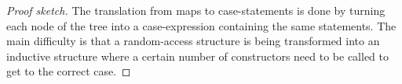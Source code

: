 \begin{proof}[Proof sketch]
  The translation from maps to case-statements is done by turning each node of
  the tree into a case-expression containing the same statements.  The main
  difficulty is that a random-access structure is being transformed into an
  inductive structure where a certain number of constructors need to be called
  to get to the correct case.
\end{proof}



